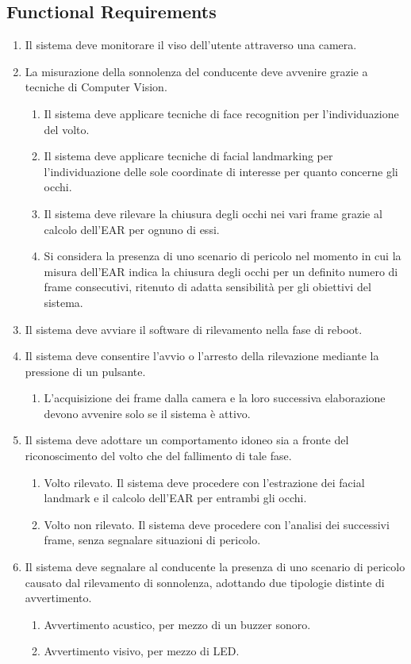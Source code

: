 \documentclass[12pt]{article}
\begin{document}
\subsection{Functional Requirements}
\begin{enumerate}
	\item Il sistema deve monitorare il viso dell'utente attraverso una camera.
	\item La misurazione della sonnolenza del conducente deve avvenire grazie a tecniche di Computer Vision.
	\begin{enumerate}
		\item Il sistema deve applicare tecniche di face recognition per l'individuazione del volto.
		\item Il sistema deve applicare tecniche di facial landmarking per l'individuazione delle sole coordinate di interesse per quanto concerne gli occhi.
		\item Il sistema deve rilevare la chiusura degli occhi nei vari frame grazie al calcolo dell'EAR per ognuno di essi.
		\item Si considera la presenza di uno scenario di pericolo nel momento in cui la misura dell'EAR indica la chiusura degli occhi per un definito numero di frame consecutivi, ritenuto di adatta sensibilità per gli obiettivi del sistema.
	\end{enumerate}
	\item Il sistema deve avviare il software di rilevamento nella fase di reboot.
	\item Il sistema deve consentire l'avvio o l'arresto della rilevazione mediante la pressione di un pulsante.
	\begin{enumerate}
		\item L'acquisizione dei frame dalla camera e la loro successiva elaborazione devono avvenire solo se il sistema è attivo.
	\end{enumerate}
	\item Il sistema deve adottare un comportamento idoneo sia a fronte del riconoscimento del volto che del fallimento di tale fase.
	\begin{enumerate}
		\item Volto rilevato. Il sistema deve procedere con l'estrazione dei facial landmark e il calcolo dell'EAR per entrambi gli occhi.
		\item Volto non rilevato. Il sistema deve procedere con l'analisi dei successivi frame, senza segnalare situazioni di pericolo.
	\end{enumerate}
	\item Il sistema deve segnalare al conducente la presenza di uno scenario di pericolo causato dal rilevamento di sonnolenza, adottando due tipologie distinte di avvertimento.
	\begin{enumerate}
		\item Avvertimento acustico, per mezzo di un buzzer sonoro.
		\item Avvertimento visivo, per mezzo di LED.
	\end{enumerate}
\end{enumerate}
\end{document}

